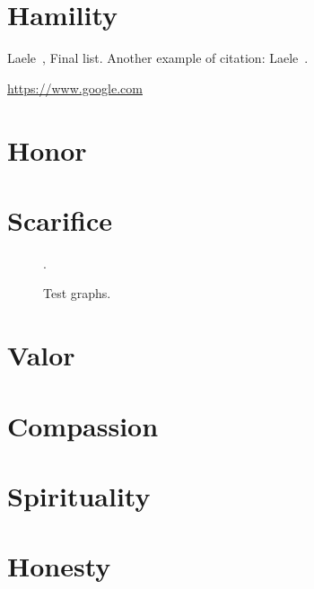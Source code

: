 \begin{multicols}{2}
\CKEcontents{}{}

\section{Hamility}

  Laele~\cite{ctn:FR1}, Final list. Another example of citation: Laele~.

  \lipsum[1-2]
  
  \begin{question}
    \lipsum[5]
  \end{question}

  \url{https://www.google.com}

\section{Honor}
  \lipsum[3]

\section{Scarifice}
  \lipsum[4]

\begin{figure*}
  \centering
  \DeclareGraphicsExtensions.
  \caption{Test graphs.} \label{fig:test}
\end{figure*}

\section{Valor}
  \lipsum[6]

\section{Compassion}
  \lipsum[7-9]

\section{Spirituality}
  \lipsum[10]

\section{Honesty}
  \lipsum[11]


\end{multicols}
